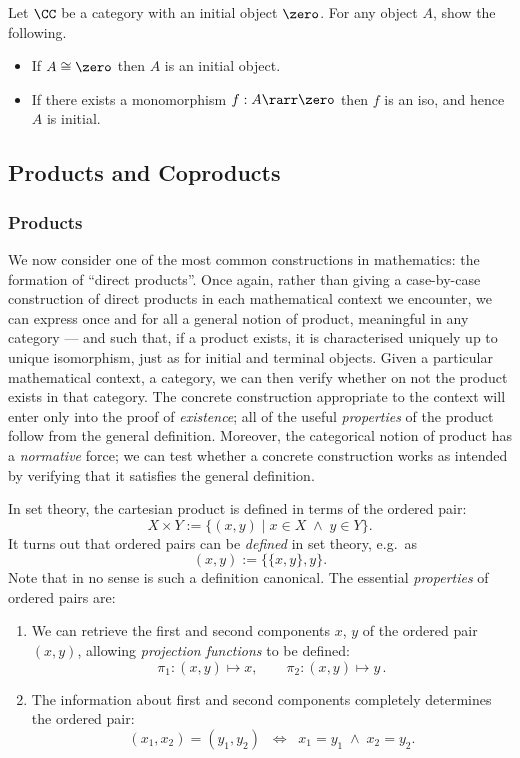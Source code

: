 \documentclass[12pt]{article}
\begin{document}
\begin{myexercise}
Let $\CC$ be a category with an initial object $\zero$. For any object $A$, show the following.
\begin{itemize}
  \item If $A\cong\zero$ then $A$ is an initial object.
  \item If there exists a monomorphism $f:A\rarr\zero$ then $f$ is an iso, and hence $A$ is initial.
\end{itemize}
\end{myexercise}


\subsection{Products and Coproducts}

\subsubsection{Products}
We now consider one of the most common constructions in mathematics: the formation of ``direct products''. Once again, rather than giving a case-by-case construction of direct products in each mathematical context we encounter, we can express once and for all a general notion of product, meaningful in any category --- and such that, if a product exists, it is characterised uniquely up to unique isomorphism, just as for initial and terminal objects. Given a particular mathematical context, \ie a category, we can then verify whether on not the product exists in that category. The concrete construction appropriate to the context will enter only into the proof of \emph{existence}; all of the useful \emph{properties} of the product follow from the general definition. Moreover, the categorical notion of product has a \emph{normative} force; we can test whether a concrete construction works as intended by verifying that it satisfies the general definition.

In set theory, the cartesian product is defined in terms of the ordered pair:
\[ X \times Y := \{ (x, y) \mid x \in X \; \wedge \; y \in Y \} . \]
It turns out that ordered pairs can be \emph{defined} in set theory, e.g.~as
\[ ( x, y ) := \{ \{ x, y \}, y\} . \]
Note that in no sense is such a definition canonical. The essential \emph{properties} of ordered pairs are:
\begin{enumerate}
\item We can retrieve the first and second components $x$, $y$ of the ordered pair $(x, y )$, allowing \emph{projection functions} to be defined:
\[ \pi_{1} : (x, y) \mapsto x, \qquad \pi_{2} : (x, y) \mapsto y \, . \]
\item The information about first and second components completely determines the ordered pair:
\[ (x_{1}, x_{2} ) =  ( y_{1}, y_{2} ) \;\; \Longleftrightarrow \;\; x_{1} = y_{1} \; \wedge \; x_{2} = y_{2} . \]
\end{enumerate}
\end{document}
